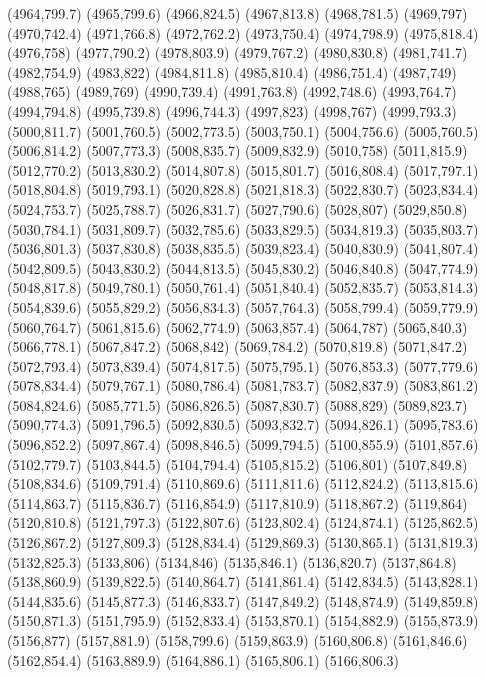 (4964,799.7)
(4965,799.6)
(4966,824.5)
(4967,813.8)
(4968,781.5)
(4969,797)
(4970,742.4)
(4971,766.8)
(4972,762.2)
(4973,750.4)
(4974,798.9)
(4975,818.4)
(4976,758)
(4977,790.2)
(4978,803.9)
(4979,767.2)
(4980,830.8)
(4981,741.7)
(4982,754.9)
(4983,822)
(4984,811.8)
(4985,810.4)
(4986,751.4)
(4987,749)
(4988,765)
(4989,769)
(4990,739.4)
(4991,763.8)
(4992,748.6)
(4993,764.7)
(4994,794.8)
(4995,739.8)
(4996,744.3)
(4997,823)
(4998,767)
(4999,793.3)
(5000,811.7)
(5001,760.5)
(5002,773.5)
(5003,750.1)
(5004,756.6)
(5005,760.5)
(5006,814.2)
(5007,773.3)
(5008,835.7)
(5009,832.9)
(5010,758)
(5011,815.9)
(5012,770.2)
(5013,830.2)
(5014,807.8)
(5015,801.7)
(5016,808.4)
(5017,797.1)
(5018,804.8)
(5019,793.1)
(5020,828.8)
(5021,818.3)
(5022,830.7)
(5023,834.4)
(5024,753.7)
(5025,788.7)
(5026,831.7)
(5027,790.6)
(5028,807)
(5029,850.8)
(5030,784.1)
(5031,809.7)
(5032,785.6)
(5033,829.5)
(5034,819.3)
(5035,803.7)
(5036,801.3)
(5037,830.8)
(5038,835.5)
(5039,823.4)
(5040,830.9)
(5041,807.4)
(5042,809.5)
(5043,830.2)
(5044,813.5)
(5045,830.2)
(5046,840.8)
(5047,774.9)
(5048,817.8)
(5049,780.1)
(5050,761.4)
(5051,840.4)
(5052,835.7)
(5053,814.3)
(5054,839.6)
(5055,829.2)
(5056,834.3)
(5057,764.3)
(5058,799.4)
(5059,779.9)
(5060,764.7)
(5061,815.6)
(5062,774.9)
(5063,857.4)
(5064,787)
(5065,840.3)
(5066,778.1)
(5067,847.2)
(5068,842)
(5069,784.2)
(5070,819.8)
(5071,847.2)
(5072,793.4)
(5073,839.4)
(5074,817.5)
(5075,795.1)
(5076,853.3)
(5077,779.6)
(5078,834.4)
(5079,767.1)
(5080,786.4)
(5081,783.7)
(5082,837.9)
(5083,861.2)
(5084,824.6)
(5085,771.5)
(5086,826.5)
(5087,830.7)
(5088,829)
(5089,823.7)
(5090,774.3)
(5091,796.5)
(5092,830.5)
(5093,832.7)
(5094,826.1)
(5095,783.6)
(5096,852.2)
(5097,867.4)
(5098,846.5)
(5099,794.5)
(5100,855.9)
(5101,857.6)
(5102,779.7)
(5103,844.5)
(5104,794.4)
(5105,815.2)
(5106,801)
(5107,849.8)
(5108,834.6)
(5109,791.4)
(5110,869.6)
(5111,811.6)
(5112,824.2)
(5113,815.6)
(5114,863.7)
(5115,836.7)
(5116,854.9)
(5117,810.9)
(5118,867.2)
(5119,864)
(5120,810.8)
(5121,797.3)
(5122,807.6)
(5123,802.4)
(5124,874.1)
(5125,862.5)
(5126,867.2)
(5127,809.3)
(5128,834.4)
(5129,869.3)
(5130,865.1)
(5131,819.3)
(5132,825.3)
(5133,806)
(5134,846)
(5135,846.1)
(5136,820.7)
(5137,864.8)
(5138,860.9)
(5139,822.5)
(5140,864.7)
(5141,861.4)
(5142,834.5)
(5143,828.1)
(5144,835.6)
(5145,877.3)
(5146,833.7)
(5147,849.2)
(5148,874.9)
(5149,859.8)
(5150,871.3)
(5151,795.9)
(5152,833.4)
(5153,870.1)
(5154,882.9)
(5155,873.9)
(5156,877)
(5157,881.9)
(5158,799.6)
(5159,863.9)
(5160,806.8)
(5161,846.6)
(5162,854.4)
(5163,889.9)
(5164,886.1)
(5165,806.1)
(5166,806.3)
